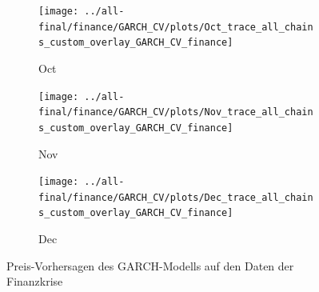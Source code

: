 \documentclass[ngerman]{ttlab-qualify}
\begin{document}
\begin{figure}[H]
  \begin{subfigure}{.3\linewidth}
  \texttt{[image: ../all-final/finance/GARCH\_CV/plots/Oct\_trace\_all\_chains\_custom\_overlay\_GARCH\_CV\_finance]}\hfill
  \caption{Oct}
  \end{subfigure}
  \begin{subfigure}{.3\linewidth}
  \texttt{[image: ../all-final/finance/GARCH\_CV/plots/Nov\_trace\_all\_chains\_custom\_overlay\_GARCH\_CV\_finance]}\hfill
  \caption{Nov}
  \end{subfigure}
  \begin{subfigure}{.3\linewidth}
  \texttt{[image: ../all-final/finance/GARCH\_CV/plots/Dec\_trace\_all\_chains\_custom\_overlay\_GARCH\_CV\_finance]}\hfill
  \caption{Dec}
  \end{subfigure}
  \caption{Preis-Vorhersagen des GARCH-Modells auf den Daten der Finanzkrise}
\end{figure}
\end{document}
